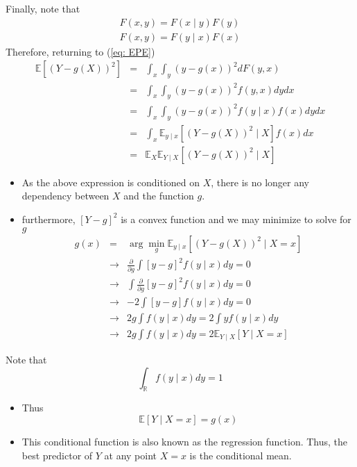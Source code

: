 \documentclass{beamer}
\newcommand{\E}{\mathbb{E}}
\newcommand{\R}{\mathbb{R}}
\begin{document}
\begin{frame}
Finally, note that 
\begin{eqnarray*}
F(x,y)=F(x\mid y)F(y)\\
F(x,y)=F(y\mid x)F(x)
\end{eqnarray*}
Therefore, returning to (\ref{eq: EPE})
\begin{eqnarray*}
\E[(Y-g(X))^2]&=&\int_x\int_y(y-g(x))^2dF(y,x)\\
&=&\int_x\int_y(y-g(x))^2f(y,x)dydx\\
&=&\int_x\int_y(y-g(x))^2f(y\mid x)f(x)dydx\\
&=&\int_x\E_{y\mid x}[(Y-g(X))^2\mid X]f(x)dx\\
&=&\E_X\E_{Y\mid X}[(Y-g(X))^2\mid X]
\end{eqnarray*}
\end{frame}

\begin{frame}
\begin{itemize}
\item{} As the above expression is conditioned on $X$, there is no longer any dependency between $X$ and the function $g$.

\item{} furthermore, $[Y-g]^2$ is a convex function and we may minimize to solve for $g$
\begin{eqnarray*}
g(x)&=&\arg\min_{g}\E_{y\mid x}[(Y-g(X))^2\mid X=x]\\
&\rightarrow& \frac{\partial}{\partial g}\int[y-g]^2 f(y\mid x)dy=0\\
&\rightarrow& \int \frac{\partial}{\partial g}[y-g]^2 f(y\mid x)dy=0\\
&\rightarrow& -2\int[y-g]  f(y\mid x)dy=0\\
&\rightarrow& 2g\int f(y\mid x)dy=2\int y  f(y\mid x)dy\\
&\rightarrow& 2g\int f(y\mid x)dy=2\E_{Y\mid X}[Y\mid X=x]
\end{eqnarray*}
\end{itemize}
\end{frame}

\begin{frame}
Note that 
\[
\int_{\R}f(y\mid x)dy=1
\]
\begin{itemize}
\item{}Thus
\[
\E[Y\mid X=x]=g(x)
\]
\item{} This conditional function is also known as the regression function. Thus, the best predictor of $Y$ at any point $X=x$ is the conditional mean.
\end{itemize}
\end{frame}
\end{document}
